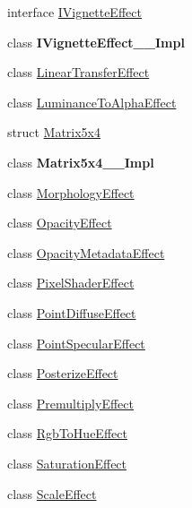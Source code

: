 \begin{DoxyCompactItemize}
\item 
interface \hyperlink{interface_microsoft_1_1_graphics_1_1_canvas_1_1_effects_1_1_i_vignette_effect}{I\+Vignette\+Effect}
\item 
class {\bfseries I\+Vignette\+Effect\+\_\+\+\_\+\+Impl}
\item 
class \hyperlink{class_microsoft_1_1_graphics_1_1_canvas_1_1_effects_1_1_linear_transfer_effect}{Linear\+Transfer\+Effect}
\item 
class \hyperlink{class_microsoft_1_1_graphics_1_1_canvas_1_1_effects_1_1_luminance_to_alpha_effect}{Luminance\+To\+Alpha\+Effect}
\item 
struct \hyperlink{struct_microsoft_1_1_graphics_1_1_canvas_1_1_effects_1_1_matrix5x4}{Matrix5x4}
\item 
class {\bfseries Matrix5x4\+\_\+\+\_\+\+Impl}
\item 
class \hyperlink{class_microsoft_1_1_graphics_1_1_canvas_1_1_effects_1_1_morphology_effect}{Morphology\+Effect}
\item 
class \hyperlink{class_microsoft_1_1_graphics_1_1_canvas_1_1_effects_1_1_opacity_effect}{Opacity\+Effect}
\item 
class \hyperlink{class_microsoft_1_1_graphics_1_1_canvas_1_1_effects_1_1_opacity_metadata_effect}{Opacity\+Metadata\+Effect}
\item 
class \hyperlink{class_microsoft_1_1_graphics_1_1_canvas_1_1_effects_1_1_pixel_shader_effect}{Pixel\+Shader\+Effect}
\item 
class \hyperlink{class_microsoft_1_1_graphics_1_1_canvas_1_1_effects_1_1_point_diffuse_effect}{Point\+Diffuse\+Effect}
\item 
class \hyperlink{class_microsoft_1_1_graphics_1_1_canvas_1_1_effects_1_1_point_specular_effect}{Point\+Specular\+Effect}
\item 
class \hyperlink{class_microsoft_1_1_graphics_1_1_canvas_1_1_effects_1_1_posterize_effect}{Posterize\+Effect}
\item 
class \hyperlink{class_microsoft_1_1_graphics_1_1_canvas_1_1_effects_1_1_premultiply_effect}{Premultiply\+Effect}
\item 
class \hyperlink{class_microsoft_1_1_graphics_1_1_canvas_1_1_effects_1_1_rgb_to_hue_effect}{Rgb\+To\+Hue\+Effect}
\item 
class \hyperlink{class_microsoft_1_1_graphics_1_1_canvas_1_1_effects_1_1_saturation_effect}{Saturation\+Effect}
\item 
class \hyperlink{class_microsoft_1_1_graphics_1_1_canvas_1_1_effects_1_1_scale_effect}{Scale\+Effect}

\end{DoxyCompactItemize}
